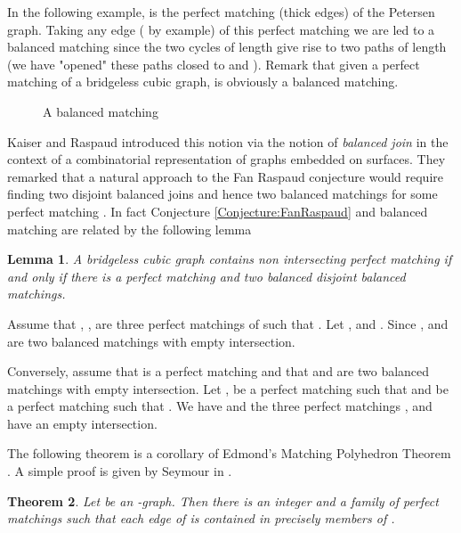 \documentclass{elsart}
\theoremstyle{plain} \theoremheaderfont{\scshape}
\newtheorem{Thm}{\bf Theorem}
\newtheorem{Lem}[Thm]{\bf Lemma}
\newenvironment{Prf}{{\bf \noindent Proof } }{\hfill\\}
\begin{document}
In the following example,  is the perfect matching (thick edges)
of the Petersen graph. Taking any edge ( by example) of this
perfect matching we are led to a balanced matching since the two
cycles of length  give rise to two paths of length  (we have
"opened" these paths closed to  and ). Remark that given a
perfect matching  of a bridgeless cubic graph,  is obviously a
balanced matching.


\begin{figure}[t]
\centering {} \hsize \noindent {}
\caption{A balanced matching} \label{Figure:Petersen}
\end{figure}

Kaiser and Raspaud \cite{KaiRas} introduced this notion via the
notion of {\em balanced join} in  the context of a combinatorial
representation of graphs embedded on surfaces. They remarked that a
natural approach to the Fan Raspaud conjecture would require finding
two disjoint balanced joins and hence two balanced matchings for
some perfect matching . In fact  Conjecture
\ref{Conjecture:FanRaspaud} and balanced matching are related by the
following lemma

\begin{Lem}\label{Lemma:FondamentalDisjointsBalanced}
A bridgeless cubic graph contains  non intersecting perfect
matching if and only if there is a perfect matching  and two
balanced disjoint balanced matchings.
\end{Lem}
\begin{Prf} Assume that , ,  are three perfect
matchings of  such that . Let
,  and . Since ,  and  are two balanced matchings with
empty intersection.

Conversely, assume that  is a perfect matching and that  and
 are two balanced matchings with empty intersection. Let
,  be a perfect matching such that 
 and  be a perfect
matching such that . We have  and the three perfect matchings ,  and 
have an empty intersection.
\end{Prf}

 The following theorem is a corollary of Edmond's Matching Polyhedron
Theorem \cite{Edm}. A simple proof is given by Seymour in
\cite{Sey}.

\begin{Thm} \label{Theorem:EdmondsSeymour} Let  be an -graph. Then there is an integer 
and a family  of perfect matchings such that each edge
of  is contained in precisely  members of .
\end{Thm}
\end{document}
